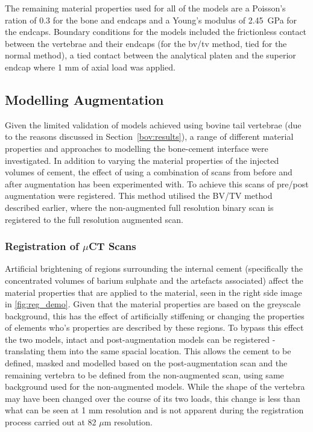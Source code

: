 The remaining material properties used for all of the models are a Poisson's
ration of 0.3 for the bone and endcaps and a Young's modulus of 2.45~GPa for
the endcaps. Boundary conditions for the models included the frictionless contact between the vertebrae and their endcaps (for the bv/tv method, tied for the normal method), a tied contact between the analytical platen and the superior endcap where 1 mm of axial load was applied. 



\subsection{Modelling Augmentation}

Given the limited validation of models achieved using bovine tail vertebrae
(due to the reasons discussed in Section~\ref{bov:results}), a range of
different material properties and approaches to modelling the bone-cement
interface were investigated.
In addition to varying the material properties of the injected volumes of
cement, the effect of using a combination of scans from before and after
augmentation has been experimented with.
To achieve this scans of pre/post augmentation were registered.
This method utilised the BV/TV method described earlier, where the
non-augmented full resolution binary scan is registered to the full
resolution augmented scan.

\subsubsection{Registration of $\mu$CT Scans}

Artificial brightening of regions surrounding the internal cement (specifically
the concentrated volumes of barium sulphate and the artefacts associated)
affect the material properties that are applied to the material, seen in the
right side image in \cref{fig:reg_demo}. Given that the material properties are based on the greyscale background, this has the effect of artificially stiffening or changing the properties of elements who's properties are described by these regions.
To bypass this effect the two models, intact and post-augmentation models can
be registered - translating them into the same spacial location.
This allows the cement to be defined, masked and modelled based on the
post-augmentation scan and the remaining vertebra to be defined from the non-augmented
scan, using same background used for the non-augmented models.
While the shape of the vertebra may have been changed over the course of its
two loads, this change is less than what can be seen at 1 mm resolution and is
not apparent during the registration process carried out at 82 $\mu$m
resolution.

